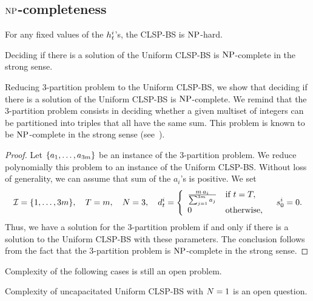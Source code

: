 \subsection{$\operatorname{NP}$-completeness}
\label{sec:PDP:deterministic:theoretical-results:NP-completeness}

For any fixed values of the $h_t^i$'s, the CLSP-BS is $\operatorname{NP}$-hard.

\begin{thm}
  Deciding if there is a solution of the Uniform CLSP-BS is $\operatorname{NP}$-complete in the strong sense.
\end{thm}



Reducing 3-partition problem to the Uniform CLSP-BS, we show that deciding if there is a solution of the Uniform CLSP-BS is $\operatorname{NP}$-complete.
We remind that the 3-partition problem consists in deciding whether a given multiset of integers can be partitioned into triples that all have the same sum.
This problem is known to be $\operatorname{NP}$-complete in the strong sense (see~\cite{Garey1979}).



\begin{proof}
Let $\crbracket{a_1,\ldots,a_{3m}}$ be an instance of the 3-partition problem.
We reduce polynomially this problem to an instance of the Uniform CLSP-BS.
Without loss of generality, we can assume that sum of the $a_i$'s is positive.
We set
\begin{equation}
  \REF=\range[1]{3m}
  ,\quad
  \horizon=m
  ,\quad
  \nbsetups=3
  ,\quad
  \demand_t^i
  =\left\{
  \begin{array}{ll}
  \frac{m\,a_i}{\sum_{j=1}^{3m}a_j} & \mbox{if}\ t=\horizon,
  \\
  0 & \mbox{otherwise,}\end{array}
  \right.
  \quad
  \inventory_0^i=0.
\end{equation}
Thus, we have a solution for the 3-partition problem if and only if there is a solution to the Uniform CLSP-BS with these parameters.
The conclusion follows from the fact that the 3-partition problem is $\operatorname{NP}$-complete in the strong sense.
\end{proof}


Complexity of the following cases is still an open problem.
\begin{question}
Complexity of uncapacitated Uniform CLSP-BS with $N=1$ is an open question.
\end{question}

